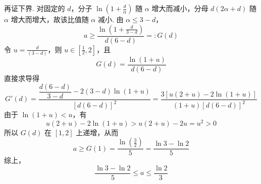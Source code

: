 \begin{problem}
\begin{solution}
\begin{enumerate}
再证下界. 对固定的 \(d\)，分子
\(\ln(1+\frac{d}{\alpha})\) 随 \(\alpha\) 增大而减小，分母
\(d(2\alpha+d)\) 随 \(\alpha\) 增大而增大，故该比值随 \(\alpha\) 减小. 由
\(\alpha\leqslant3-d\)，
\[
a\geqslant
\frac{\ln\left(1+\frac{d}{3-d}\right)}{d(6-d)}
=:G(d)
\]
令 \(u=\frac{d}{(3-d)}\)，则 \(u\in[\frac{1}{2},2]\)，且
\[
G(d)=\frac{\ln(1+u)}{d(6-d)}
\]
直接求导得
\[
G'(d)=
\frac{\dfrac{d(6-d)}{3-d}-2(3-d)\ln(1+u)}{[d(6-d)]^2}
=\frac{3\left[u(2+u)-2\ln(1+u)\right]}{(1+u)[d(6-d)]^2}
\]
由于 \(\ln(1+u)<u\)，有
\[
u(2+u)-2\ln(1+u)>u(2+u)-2u=u^2>0
\]
所以 \(G(d)\) 在 \([1,2]\) 上递增，从而
\[
a\geqslant G(1)
=\frac{\ln\left(\frac32\right)}5
=\frac{\ln3-\ln2}{5}
\]
综上，
\[
\frac{\ln3-\ln2}{5}\leqslant a\leqslant\frac{\ln2}{3}
\]
\end{enumerate}
\end{solution}
\end{problem}

